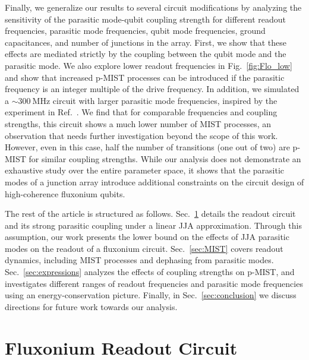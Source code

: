 \documentclass[%
reprint,
superscriptaddress,
 amsmath,amssymb,
 aps,
 prx,
longbibliography,
floatfix,
]{revtex4-2}
\begin{document}
Finally, we generalize our results to several circuit modifications by analyzing the sensitivity of the parasitic mode-qubit coupling strength for different readout frequencies, parasitic mode frequencies, qubit mode frequencies, ground capacitances, and number of junctions in the array. First, we show that these effects are mediated strictly by the coupling between the qubit mode and the parasitic mode. We also explore lower readout frequencies in Fig.~\ref{fig:Flo_low} and show that increased p-MIST processes can be introduced if the parasitic frequency is an integer multiple of the drive frequency. In addition, we simulated a $\sim 300 \ \mathrm{MHz}$ circuit with larger parasitic mode frequencies, inspired by the experiment in Ref.~\cite{ding_high-fidelity_2023}. We find that for comparable frequencies and coupling strengths, this circuit shows a much lower number of MIST processes, an observation that needs further investigation beyond the scope of this work. However, even in this case, half the number of transitions (one out of two) are p-MIST for similar coupling strengths. While our analysis does not demonstrate an exhaustive study over the entire parameter space, it shows that the parasitic modes of a junction array introduce additional constraints on the circuit design of high-coherence fluxonium qubits.


The rest of the article is structured as follows. Sec.~\ref{sec:Fluxonium} details the readout circuit and its strong parasitic coupling under a linear JJA approximation. Through this assumption, our work presents the lower bound on the effects of JJA parasitic modes on the readout of a fluxonium circuit. Sec.~\ref{sec:MIST} covers readout dynamics, including MIST processes and dephasing from parasitic modes. Sec.~\ref{sec:expressions} analyzes the effects of coupling strengths on p-MIST, and investigates different ranges of readout frequencies and parasitic mode frequencies using an energy-conservation picture. Finally, in Sec.~\ref{sec:conclusion} we discuss directions for future work towards our analysis.

\section{Fluxonium Readout Circuit}\label{sec:Fluxonium}
\end{document}
